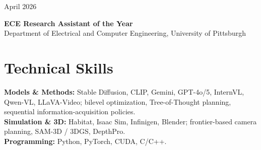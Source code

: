 \documentclass[11pt, letterpaper]{article}
\newenvironment{datedentry}[1]{%
  \par\noindent
  \begin{minipage}[t]{2.8cm}\raggedright\small #1\end{minipage}%
  \hspace{0.3cm}%
  \begin{minipage}[t]{\dimexpr\linewidth-3.1cm\relax}\raggedright
}{\end{minipage}\par\medskip}
\begin{document}
\begin{datedentry}{April 2026}
\textbf{ECE Research Assistant of the Year}\\
Department of Electrical and Computer Engineering, University of Pittsburgh
\end{datedentry}

\section{Technical Skills}
\textbf{Models \& Methods:} Stable Diffusion, CLIP, Gemini, GPT-4o/5, InternVL, Qwen-VL, LLaVA-Video; bilevel optimization, Tree-of-Thought planning, sequential information-acquisition policies.\\[2pt]
\textbf{Simulation \& 3D:} Habitat, Isaac Sim, Infinigen, Blender; frontier-based camera planning, SAM-3D / 3DGS, DepthPro.\\[2pt]
\textbf{Programming:} Python, PyTorch, CUDA, C/C++.
\end{document}
